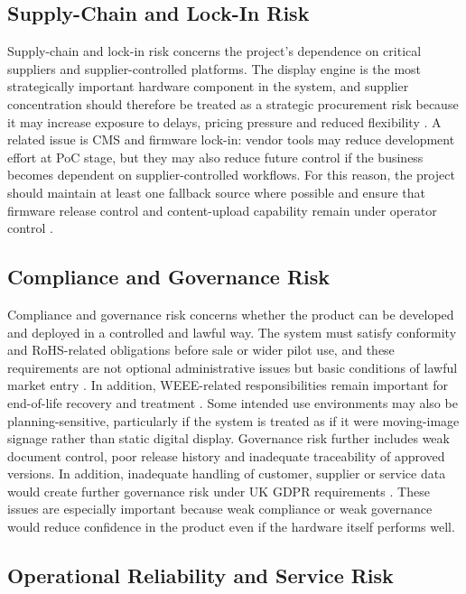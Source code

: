 \documentclass[11pt,a4paper]{article}
\begin{document}
\subsection{Supply-Chain and Lock-In Risk}

Supply-chain and lock-in risk concerns the project's dependence on critical suppliers and supplier-controlled platforms. The display engine is the most strategically important hardware component in the system, and supplier concentration should therefore be treated as a strategic procurement risk because it may increase exposure to delays, pricing pressure and reduced flexibility \cite{ref14,ref15}. A related issue is CMS and firmware lock-in: vendor tools may reduce development effort at PoC stage, but they may also reduce future control if the business becomes dependent on supplier-controlled workflows. For this reason, the project should maintain at least one fallback source where possible and ensure that firmware release control and content-upload capability remain under operator control \cite{ref14,ref15}.

\subsection{Compliance and Governance Risk}

Compliance and governance risk concerns whether the product can be developed and deployed in a controlled and lawful way. The system must satisfy conformity and RoHS-related obligations before sale or wider pilot use, and these requirements are not optional administrative issues but basic conditions of lawful market entry \cite{ref19,ref20}. In addition, WEEE-related responsibilities remain important for end-of-life recovery and treatment \cite{ref22}. Some intended use environments may also be planning-sensitive, particularly if the system is treated as if it were moving-image signage rather than static digital display. Governance risk further includes weak document control, poor release history and inadequate traceability of approved versions. In addition, inadequate handling of customer, supplier or service data would create further governance risk under UK GDPR requirements \cite{ref29}. These issues are especially important because weak compliance or weak governance would reduce confidence in the product even if the hardware itself performs well.

\subsection{Operational Reliability and Service Risk}
\end{document}
